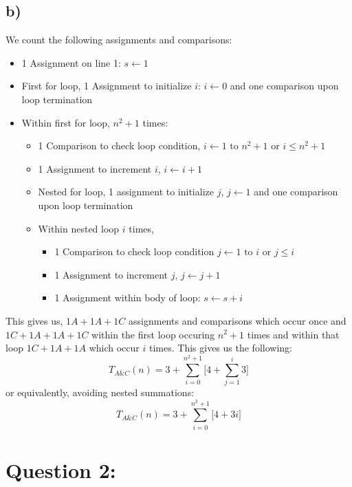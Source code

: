 \documentclass{article}
\begin{document}
\subsection*{b)}
We count the following assignments and comparisons:
\begin{itemize}
    \item 1 Assignment on line 1: $\boxed{s\leftarrow 1}$
    \item First for loop, 1 Assignment to initialize $i$: $\boxed{i\leftarrow 0}$ and one comparison upon loop termination
    \item Within first for loop, $n^{2}+1$ times: \begin{itemize}
        \item 1 Comparison to check loop condition, $\boxed{i\leftarrow 1 \text{ to } n^{2}+1}$ or $\boxed{i\leq n^{2}+1}$
        \item 1 Assignment to increment $i$, $\boxed{i\leftarrow i+1}$
        \item Nested for loop, 1 assignment to initialize $j$, $\boxed{j \leftarrow 1}$ and one comparison upon loop termination
        \item Within nested loop $i$ times, \begin{itemize}
            \item 1 Comparison to check loop condition $\boxed{j\leftarrow 1} \text{ to } i$ or $\boxed{j\leq i}$
            \item 1 Assignment to increment $j$, $\boxed{j\leftarrow j+1}$
            \item 1 Assignment within body of loop: $\boxed{s\leftarrow s + i}$ 
        \end{itemize}
    \end{itemize}
\end{itemize}
This gives us, $1A+1A+1C$ assignments and comparisons which occur once and $1C+1A+1A+1C$ within the first loop occuring $n^{2}+1$ times and within that loop $1C+1A+1A$ which occur $i$ times. This gives us the following: $$T_{A\&C}(n)=3+\sum_{i=0}^{n^{2}+1}\bigg[4+\sum_{j=1}^i 3\bigg]$$
or equivalently, avoiding nested summations: $$T_{A\&C}(n)=3+\sum_{i=0}^{n^{2}+1}\bigg[4+3i\bigg]$$

\newpage
\section*{Question 2:}
\newpage
\end{document}
